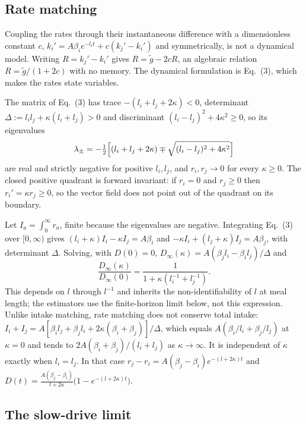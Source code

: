 \documentclass[12pt]{article}
\theoremstyle{definition}
\newcommand{\ki}{k_i}
\newcommand{\kj}{k_j}
\newcommand{\gt}{\tilde{g}}
\begin{document}
\subsection{Rate matching}

Coupling the rates through their instantaneous difference with a dimensionless
constant $c$, $\ki'=A\beta_ie^{-l_it}+c(\kj'-\ki')$ and symmetrically, is not a
dynamical model. Writing $R=\kj'-\ki'$ gives $R=\gt-2cR$, an algebraic relation
$R=\gt/(1+2c)$ with no memory. The dynamical formulation is Eq.~(3), which makes
the rates state variables.

The matrix of Eq.~(3) has trace $-(l_i+l_j+2\kappa)<0$, determinant
$\Delta:=l_il_j+\kappa(l_i+l_j)>0$ and discriminant $(l_i-l_j)^2+4\kappa^2\ge0$, so
its eigenvalues
\[
\lambda_\pm=-\tfrac12\Bigl[(l_i+l_j+2\kappa)\mp\sqrt{(l_i-l_j)^2+4\kappa^2}\Bigr]
\]
are real and strictly negative for positive $l_i,l_j$, and $r_i,r_j\to0$ for every
$\kappa\ge0$. The closed positive quadrant is forward invariant: if $r_i=0$ and
$r_j\ge0$ then $r_i'=\kappa r_j\ge0$, so the vector field does not point out of the
quadrant on its boundary.

Let $I_a=\int_0^\infty r_a$, finite because the eigenvalues are negative.
Integrating Eq.~(3) over $[0,\infty)$ gives
$(l_i+\kappa)I_i-\kappa I_j=A\beta_i$ and $-\kappa I_i+(l_j+\kappa)I_j=A\beta_j$,
with determinant $\Delta$. Solving, with $D(0)=0$,
$D_\infty(\kappa)=A(\beta_jl_i-\beta_il_j)/\Delta$ and
\begin{equation}\label{eq:ratecontraction}
\frac{D_\infty(\kappa)}{D_\infty(0)}=\frac{1}{1+\kappa(l_i^{-1}+l_j^{-1})}.
\end{equation}
This depends on $l$ through $l^{-1}$ and inherits the non-identifiability of $l$
at meal length; the estimators use the finite-horizon limit below, not this
expression. Unlike intake matching, rate matching does not conserve total intake:
$I_i+I_j=A[\beta_il_j+\beta_jl_i+2\kappa(\beta_i+\beta_j)]/\Delta$, which equals
$A(\beta_i/l_i+\beta_j/l_j)$ at $\kappa=0$ and tends to
$2A(\beta_i+\beta_j)/(l_i+l_j)$ as $\kappa\to\infty$. It is independent of $\kappa$
exactly when $l_i=l_j$. In that case
$r_j-r_i=A(\beta_j-\beta_i)e^{-(l+2\kappa)t}$ and
$D(t)=\frac{A(\beta_j-\beta_i)}{l+2\kappa}\bigl(1-e^{-(l+2\kappa)t}\bigr)$.

\subsection{The slow-drive limit}
\end{document}
